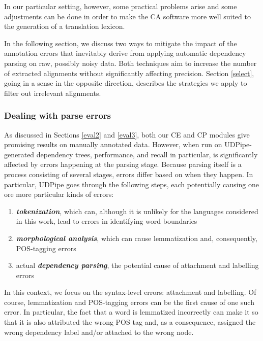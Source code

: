 In our particular setting, however, some practical problems arise and some adjustments can be done in order to make the CA software more well suited to the generation of a translation lexicon. \smallskip

In the following section, we discuss two ways to mitigate the impact of the annotation errors that inevitably derive from applying automatic dependency parsing on raw, possibly noisy data. Both techniques aim to increase the number of extracted alignments without significantly affecting precision.
Section \ref{select}, going in a sense in the opposite direction, describes the strategies we apply to filter out irrelevant alignments.

\subsubsection{Dealing with parse errors}
As discussed in Sections \ref{eval2} and \ref{eval3}, both our CE and CP modules give promising results on manually annotated data. 
However, when run on UDPipe-generated dependency trees, performance, and recall in particular, is significantly affected by errors happening at the parsing stage. 
Because parsing itself is a process consisting of several stages, errors differ based on when they happen. 
In particular, UDPipe goes through the following steps, each potentially causing one ore more particular kinds of errors: \smallskip

\begin{enumerate} 
    \item \textit{\textbf{tokenization}}, which can, although it is unlikely for the languages considered in this work, lead to errors in identifying word boundaries
    \item \textit{\textbf{morphological analysis}}, which can cause lemmatization and, consequently, POS-tagging errors
    \item actual \textit{\textbf{dependency parsing}}, the potential cause of attachment and labelling errors
\end{enumerate} \smallskip

In this context, we focus on the syntax-level errors: attachment and labelling. Of course, lemmatization and POS-tagging errors can be the first cause of one such error. 
In particular, the fact that a word is lemmatized incorrectly can make it so that it is also attributed the wrong POS tag and, as a consequence, assigned the wrong dependency label and/or attached to the wrong node. \smallskip

